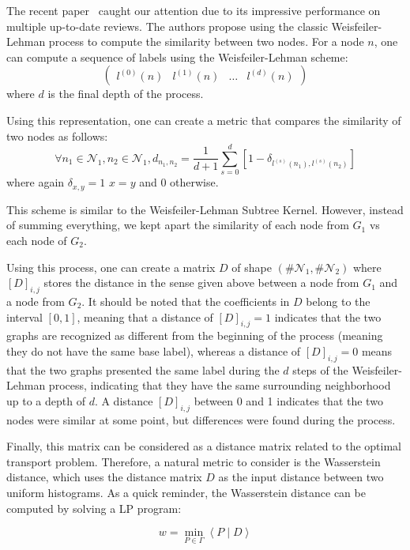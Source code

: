 \documentclass{IEEEtran}
\begin{document}
The recent paper~\cite{togninalli2019wasserstein}
caught our attention due to its impressive performance on multiple
up-to-date reviews.
The authors propose using
the classic Weisfeiler-Lehman process to compute the similarity between two nodes. For a node $n$, one can compute a sequence of labels using the Weisfeiler-Lehman scheme:
$$\begin{pmatrix} l^{(0)}(n) & l^{(1)}(n) & \dots & l^{(d)}(n)\end{pmatrix} $$
where $d$ is the final depth of the process.

Using this representation, one can create a metric that compares the similarity of two nodes as follows:
\begin{equation*}
    \forall n_1 \in \mathcal{N}_1, n_2 \in \mathcal{N}_1,
    d_{n_1, n_2} = \frac{1}{d+1} \sum_{s = 0}^d [1 - \delta_{l^{(s)}(n_1), l^{(s)}(n_2)}]
\end{equation*}
where again $\delta_{x, y} = 1$  $x=y$ and $0$ otherwise.

This scheme is similar to the Weisfeiler-Lehman Subtree Kernel.
However, instead of summing everything,
we kept apart the similarity of each node from $G_1$ vs each node of $G_2$.

Using this process, one can create a matrix $D$ of shape
$(\# \mathcal{N}_1, \# \mathcal{N}_2)$
where $[D]_{i,j}$ stores the distance in the sense given above between a node from
$G_1$ and a node from $G_2$.
It should be noted that the coefficients in $D$ belong to the interval $[0,1]$,
meaning that a distance of $[D]_{i,j} = 1$ indicates that the two graphs are recognized as
different from the beginning of the process (meaning they do not have the same base label),
whereas a distance of $[D]_{i,j} = 0$ means that the two graphs presented the same label
during the $d$ steps of the Weisfeiler-Lehman process,
indicating that they have the same surrounding neighborhood up to a depth of $d$.
A distance $[D]_{i,j}$ between 0 and 1 indicates that the two nodes were similar at some point,
but differences were found during the process.

Finally, this matrix can be considered as a distance matrix related to the optimal
transport problem. Therefore, a natural metric to consider is the Wasserstein distance,
which uses the distance matrix $D$ as the input distance between two uniform histograms.
As a quick reminder, the Wasserstein distance can be computed by solving a LP program: ~\cite{togninalli2019wasserstein}

\begin{equation*}
    w = \underset{P \in \Gamma}{\operatorname*{min}} \left< P \; | \; D \right>
\end{equation*}
\end{document}
